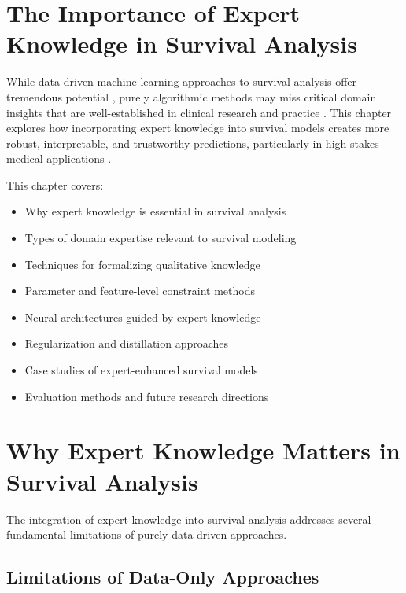 \section{The Importance of Expert Knowledge in Survival Analysis}

While data-driven machine learning approaches to survival analysis offer tremendous potential \parencite{katzman2018,lee2018}, purely algorithmic methods may miss critical domain insights that are well-established in clinical research and practice \parencite{radfar2022,rudin2022}. This chapter explores how incorporating expert knowledge into survival models creates more robust, interpretable, and trustworthy predictions, particularly in high-stakes medical applications \parencite{kuo2020,ghassemi2022,karimi2021}.

\begin{notebox}[title=Chapter Overview]
This chapter covers:
\begin{itemize}
    \item Why expert knowledge is essential in survival analysis
    \item Types of domain expertise relevant to survival modeling
    \item Techniques for formalizing qualitative knowledge
    \item Parameter and feature-level constraint methods
    \item Neural architectures guided by expert knowledge
    \item Regularization and distillation approaches
    \item Case studies of expert-enhanced survival models
    \item Evaluation methods and future research directions
\end{itemize}
\end{notebox}

\section{Why Expert Knowledge Matters in Survival Analysis}

The integration of expert knowledge into survival analysis addresses several fundamental limitations of purely data-driven approaches.

\subsection{Limitations of Data-Only Approaches}

